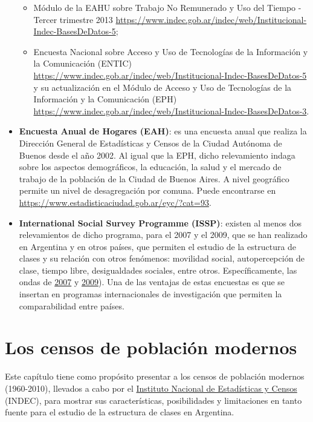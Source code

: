\documentclass[
]{article}
\providecommand{\tightlist}{%
  \setlength{\itemsep}{0pt}\setlength{\parskip}{0pt}}
\begin{document}
\begin{itemize}
  \begin{itemize}
  \tightlist
  \item
    Módulo de la EAHU sobre Trabajo No Remunerado y Uso del Tiempo - Tercer trimestre 2013 \url{https://www.indec.gob.ar/indec/web/Institucional-Indec-BasesDeDatos-5};
  \item
    Encuesta Nacional sobre Acceso y Uso de Tecnologías de la Información y la Comunicación (ENTIC) \url{https://www.indec.gob.ar/indec/web/Institucional-Indec-BasesDeDatos-5} y su actualización en el Módulo de Acceso y Uso de Tecnologías de la Información y la Comunicación (EPH) \url{https://www.indec.gob.ar/indec/web/Institucional-Indec-BasesDeDatos-3}.
  \end{itemize}
\item
  \textbf{Encuesta Anual de Hogares (EAH)}: es una encuesta anual que realiza la Dirección General de Estadísticas y Censos de la Ciudad Autónoma de Buenos desde el año 2002. Al igual que la EPH, dicho relevamiento indaga sobre los aspectos demográficos, la educación, la salud y el mercado de trabajo de la población de la Ciudad de Buenos Aires. A nivel geográfico permite un nivel de desagregación por comuna. Puede encontrarse en \url{https://www.estadisticaciudad.gob.ar/eyc/?cat=93}.
\item
  \textbf{International Social Survey Programme (ISSP)}: existen al menos dos relevamientos de dicho programa, para el 2007 y el 2009, que se han realizado en Argentina y en otros países, que permiten el estudio de la estructura de clases y su relación con otros fenómenos: movilidad social, autopercepción de clase, tiempo libre, desigualdades sociales, entre otros. Específicamente, las ondas de \href{https://dbk.gesis.org/dbksearch/sdesc2.asp?no=4850\&search=issp\%202007\&search2=\&field=all\&field2=\&DB=e\&tab=0\&notabs=\&nf=1\&af=\&ll=10}{2007} y \href{https://dbk.gesis.org/dbksearch/sdesc2.asp?no=5400\&search=issp\%202009\&search2=\&field=all\&field2=\&DB=e\&tab=0\&notabs=\&nf=1\&af=\&ll=10}{2009}). Una de las ventajas de estas encuestas es que se insertan en programas internacionales de investigación que permiten la comparabilidad entre países.
\end{itemize}

\hypertarget{fuentes2}{%
\section{Los censos de población modernos}\label{fuentes2}}

Este capítulo tiene como propósito presentar a los censos de población modernos (1960-2010), llevados a cabo por el \href{www.indec.gob.ar}{Instituto Nacional de Estadísticas y Censos} (INDEC), para mostrar sus características, posibilidades y limitaciones en tanto fuente para el estudio de la estructura de clases en Argentina.
\end{document}
